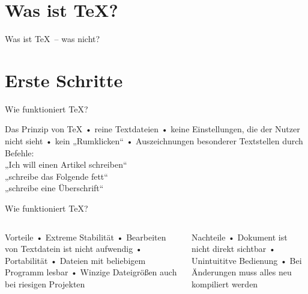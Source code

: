 \section{Was ist \TeX?}
\begin{frame}{ Was ist \TeX\ – was nicht?}
\end{frame}

\section{Erste Schritte}
\begin{frame}[fragile]{Wie funktioniert \TeX?}
\begin{block}{Das Prinzip von \TeX}
• reine Textdateien
• keine Einstellungen, die der Nutzer nicht sieht
• kein „Rumklicken“
• Auszeichnungen besonderer Textstellen durch Befehle:\\%
  „Ich will einen Artikel schreiben“\\%
  „schreibe das Folgende fett“\\%
  „schreibe eine Überschrift“%
\•
\end{block}
\end{frame}

\begin{frame}{Wie funktioniert \TeX?}
\begin{columns}\begin{column}{.45\textwidth} 
\begin{block}{ Vorteile}
• Extreme Stabilität
• Bearbeiten von Textdatein ist nicht aufwendig
• Portabilität
• Dateien mit beliebigem Programm lesbar
• Winzige Dateigrößen auch bei riesigen Projekten
\• 
\end{block}
\end{column}
\begin{column}{.45\textwidth}
\begin{block}{ Nachteile}
• Dokument ist nicht direkt sichtbar
• Unintuititve Bedienung
• Bei Änderungen muss alles neu kompiliert werden
\•
\end{block}
\end{column}
\end{columns}
\end{frame}

